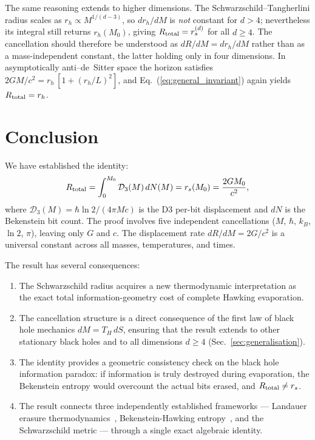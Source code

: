 \documentclass[aps,prd,twocolumn,showpacs,preprintnumbers,amsmath,amssymb,longbibliography]{revtex4-2}
\begin{document}
The same reasoning extends to higher dimensions. The Schwarzschild--Tangherlini
radius scales as $r_h \propto M^{1/(d-3)}$, so $dr_h/dM$ is \emph{not} constant
for $d>4$; nevertheless its integral still returns $r_h(M_0)$, giving
$R_{\rm total} = r_s^{(d)}$ for all $d\geq 4$. The cancellation should therefore
be understood as $dR/dM = dr_h/dM$ rather than as a mass-independent constant,
the latter holding only in four dimensions. In asymptotically anti--de~Sitter
space the horizon satisfies $2GM/c^2 = r_h\,[1+(r_h/L)^2]$, and
Eq.~(\ref{eq:general_invariant}) again yields $R_{\rm total} = r_h$.

\section{Conclusion}
\label{sec:conclusion}

We have established the identity:
\begin{equation}
R_{\rm total} = \int_0^{M_0} \mathcal{D}_3(M)\, dN(M) = r_s(M_0) = \frac{2GM_0}{c^2},
\label{eq:final}
\end{equation}
where $\mathcal{D}_3(M) = \hbar \ln 2/(4\pi Mc)$ is the D3 per-bit displacement 
and $dN$ is the Bekenstein bit count. The proof involves five independent cancellations 
($M$, $\hbar$, $k_B$, $\ln 2$, $\pi$), leaving only $G$ and $c$. The displacement 
rate $dR/dM = 2G/c^2$ is a universal constant across all masses, temperatures, and times.

The result has several consequences:

\begin{enumerate}
\item The Schwarzschild radius acquires a new thermodynamic interpretation as the 
exact total information-geometry cost of complete Hawking evaporation.

\item The cancellation structure is a direct consequence of the first law of black 
hole mechanics $dM = T_H\,dS$, ensuring that the result extends to other stationary black holes and to all dimensions $d \geq 4$ (Sec.~\ref{sec:generalisation}).

\item The identity provides a geometric consistency check on the black hole 
information paradox: if information is truly destroyed during evaporation, the 
Bekenstein entropy would overcount the actual bits erased, and $R_{\rm total} \neq r_s$.

\item The result connects three independently established frameworks --- Landauer 
erasure thermodynamics~\cite{landauer1961,berut2012}, Bekenstein-Hawking 
entropy~\cite{bekenstein1973}, and the Schwarzschild metric --- through a single 
exact algebraic identity.
\end{enumerate}
\end{document}
